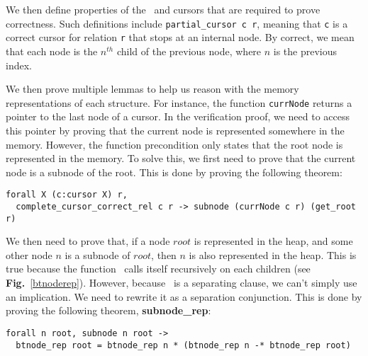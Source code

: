 We then define properties of the \btrees\ and cursors that are required to prove correctness.
Such definitions include \texttt{partial\_cursor c r}, meaning that \texttt{c} is a correct cursor for relation \texttt{r} that stops at an internal node.
By correct, we mean that each node is the $n^{th}$ child of the previous node, where $n$ is the previous index.

We then prove multiple lemmas to help us reason with the memory representations of each structure.
For instance, the function \texttt{currNode} returns a pointer to the last node of a cursor.
In the verification proof, we need to access this pointer by proving that the current node is represented somewhere in the memory.
However, the function precondition only states that the root node is represented in the memory.
To solve this, we first need to prove that the current node is a subnode of the root.
This is done by proving the following theorem:
\begin{lstlisting}[language=Coq]
  forall X (c:cursor X) r,
  complete_cursor_correct_rel c r -> subnode (currNode c r) (get_root r)
\end{lstlisting}

We then need to prove that, if a node $root$ is represented in the heap, and some other node $n$ is a subnode of $root$, then $n$ is also represented in the heap.
This is true because the function \btrep\ calls itself recursively on each children (see \textbf{Fig.}~\ref{btnoderep}).
However, because \btrep\ is a separating clause, we can't simply use an implication. We need to rewrite it as a separation conjunction.
This is done by proving the following theorem, \textbf{subnode\_rep}:

\begin{lstlisting}[language=Coq]
  forall n root, subnode n root ->
  btnode_rep root = btnode_rep n * (btnode_rep n -* btnode_rep root)
\end{lstlisting}


